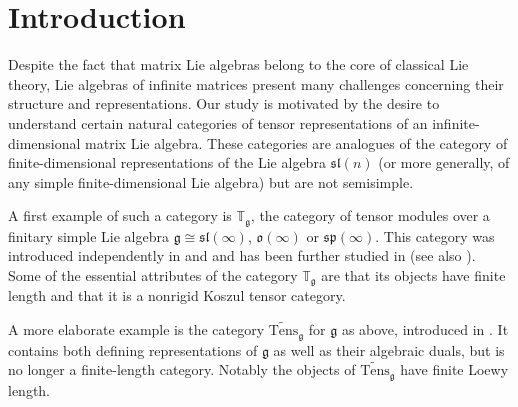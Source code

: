 \documentclass[11pt]{article}
\theoremstyle{plain}
\theoremstyle{nonumberplain}
\theoremstyle{plain}
\theoremstyle{nonumberplain}
\newcommand\bT{{\mathbb T}}
\newcommand\fg{\mathfrak{g}}
\newcommand\fsl{\mathfrak{sl}}
\newcommand\fo{\mathfrak{o}}
\newcommand\fsp{\mathfrak{sp}}
\begin{document}

\vspace{.5cm}




\tableofcontents



\section*{Introduction}\label{se.intro}

Despite the fact that matrix Lie algebras belong to the core of classical Lie theory, Lie algebras of infinite matrices present many challenges concerning their structure and representations.  Our study is motivated by the desire to understand certain natural categories of tensor representations of an infinite-dimensional matrix Lie algebra. These categories are analogues of the category of finite-dimensional representations of the Lie algebra $\fsl(n)$ (or more generally, of any simple finite-dimensional Lie algebra) but are not semisimple. 

A first example of such a category is $\bT_{\fg}$, the category of tensor modules over a finitary simple Lie algebra $\fg\cong \fsl(\infty)$, $\fo(\infty)$ or $\fsp(\infty)$. This category was introduced independently in \cite{DPS} and \cite{SS} and has been further studied in \cite{PS2} (see also \cite{PS}). Some of the essential attributes of the category $\bT_{\fg}$ are that its objects have finite length and that it is a nonrigid Koszul tensor category.  

A more elaborate example is the category $\widetilde{\mathrm{Tens}}_{\fg}$ for $\fg$ as above, introduced in \cite{PS1}. It contains both defining representations of $\fg$ as well as their algebraic duals, but is no longer a finite-length category. Notably the objects of $\widetilde{\mathrm{Tens}}_{\fg}$ have finite Loewy length. 
\end{document}
